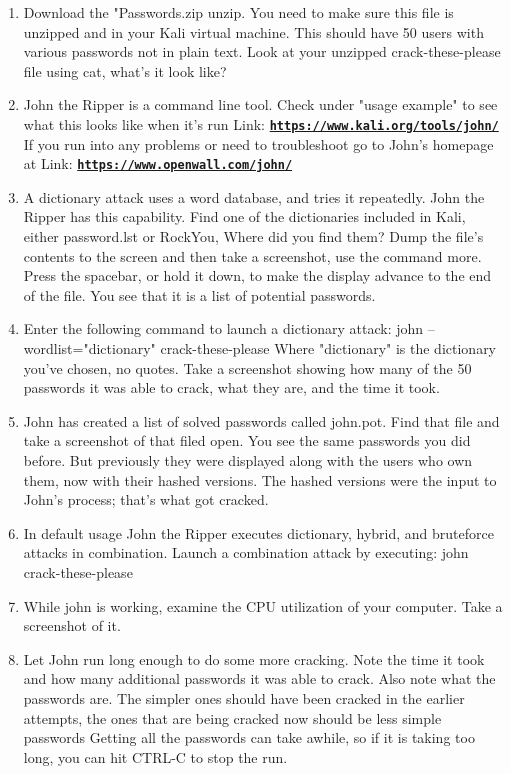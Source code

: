 \documentclass[12pt]{article}
\begin{document}
    \begin{enumerate}
        \item Download the "Passwords.zip  unzip. You need to make sure this file is unzipped and in your Kali virtual machine.  This should have 50 users with various passwords not in plain text.  Look at your unzipped crack-these-please file using cat, what's it look like?
        \item John the Ripper is a command line tool.  Check under "usage example" to see what this looks like when it's run Link: \href{https://www.kali.org/tools/john/}{\textbf{\nolinkurl{https://www.kali.org/tools/john/}}} If you run into any problems or need to troubleshoot go to John's homepage at Link: \href{https://www.openwall.com/john/}{\textbf{\nolinkurl{https://www.openwall.com/john/}}}
        \item A dictionary attack uses a word database, and tries it repeatedly. John the Ripper has this capability. Find one of the dictionaries included in Kali, either password.lst or RockYou,  Where did you find them? Dump the file's contents to the screen and then take a screenshot, use the command more.
        Press the spacebar, or hold it down, to make the display advance to the end of the file. You see that it is a list of potential passwords.
        \item Enter the following command to launch a dictionary attack:
        john --wordlist="dictionary" crack-these-please
        Where "dictionary" is the dictionary you've chosen, no quotes.
        Take a screenshot showing how many of the 50 passwords it was able to crack, what they are, and the time it took.
        \item John has created a list of solved passwords called john.pot.  Find that file and take a screenshot of that filed open.
        You see the same passwords you did before. But previously they were displayed along with the users who own them, now with their hashed versions. The hashed versions were the input to John's process; that's what got cracked.
        \item In default usage John the Ripper executes dictionary, hybrid, and bruteforce attacks in combination. Launch a combination attack by executing:
        john crack-these-please
        \item While john is working, examine the CPU utilization of your computer. Take a screenshot of it.
        \item Let John run long enough to do some more cracking. Note the time it took and how many additional passwords it was able to crack. Also note what the passwords are. The simpler ones should have been cracked in the earlier attempts, the ones that are being cracked now should be less simple passwords
        Getting all the passwords can take awhile, so if it is taking too long, you can hit CTRL-C to stop the run.
    \end{enumerate}
\end{document}
